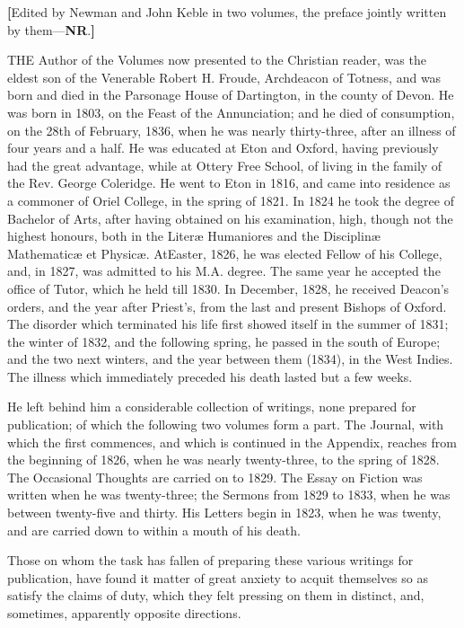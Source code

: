
\textbf{[}Edited by Newman and John
Keble in two volumes, the preface jointly written by them—\textbf{NR}.\textbf{]}


THE
Author of the Volumes now presented to the Christian reader, was the
eldest son of the Venerable Robert H. Froude, Archdeacon of Totness,
and was born and died in the Parsonage House of Dartington, in the
county of Devon. He was born in 1803, on the Feast of the
Annunciation; and he died of consumption, on the 28th of February,
1836, when he was nearly thirty-three, after an illness of four years
and a half. He was educated at Eton and Oxford, having previously had
the great advantage, while at Ottery Free School, of living in the
family of the Rev. George Coleridge. He went to Eton in 1816, and came
into residence as a commoner of Oriel College, in the spring of 1821.
In 1824 he took the degree of Bachelor of Arts, after having obtained
on his examination, high, though not the highest honours, both in
the Literæ Humaniores and the Disciplinæ Mathematicæ et Physicæ.
At\emph{}Easter, 1826, he was elected Fellow of his College, and, in
1827, was admitted to his M.A. degree. The same year he accepted the
office of Tutor, which he held till 1830. In December, 1828, he
received Deacon's orders, and the year after Priest's, from the last
and present Bishops of Oxford. The disorder which terminated his life
first showed itself in the summer of 1831; the winter of 1832, and the
following spring, he passed in the south of Europe; and the two next
winters, and the year between them (1834), in the West Indies. The
illness which immediately preceded his death lasted but a few weeks.

He left behind him a
considerable collection of writings, none prepared for publication; of
which the following two volumes form a part. The Journal, with which
the first commences, and which is continued in the Appendix, reaches
from the beginning of 1826, when he was nearly twenty-three, to the
spring of 1828. The Occasional Thoughts are carried on to 1829. The
Essay on Fiction was written when he was twenty-three; the Sermons
from 1829 to 1833, when he was between twenty-five and thirty. His
Letters begin in 1823, when he was twenty, and are carried down to
within a mouth of his death.

Those on whom the task has
fallen of preparing these various writings for publication, have found
it matter of great anxiety to acquit themselves so as satisfy the
claims of duty, which they felt pressing on them in distinct, and,
sometimes, apparently opposite directions.

